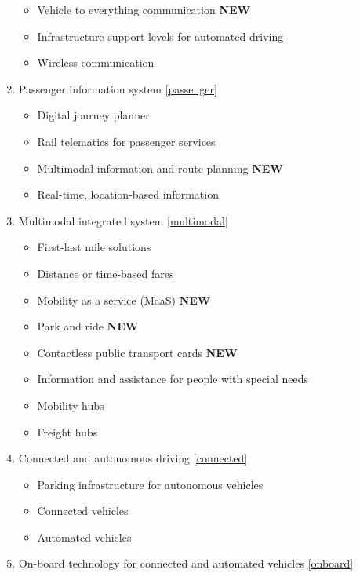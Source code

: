 \documentclass[
]{book}
\providecommand{\tightlist}{%
  \setlength{\itemsep}{0pt}\setlength{\parskip}{0pt}}
\begin{document}
\begin{enumerate}
  \begin{itemize}
  \tightlist
  \item
    Vehicle to everything communication \textbf{NEW}
  \item
    Infrastructure support levels for automated driving
  \item
    Wireless communication
  \end{itemize}
\item
  Passenger information system \ref{passenger}

  \begin{itemize}
  \tightlist
  \item
    Digital journey planner
  \item
    Rail telematics for passenger services
  \item
    Multimodal information and route planning \textbf{NEW}
  \item
    Real-time, location-based information
  \end{itemize}
\item
  Multimodal integrated system \ref{multimodal}

  \begin{itemize}
  \tightlist
  \item
    First-last mile solutions
  \item
    Distance or time-based fares
  \item
    Mobility as a service (MaaS) \textbf{NEW}
  \item
    Park and ride \textbf{NEW}
  \item
    Contactless public transport cards \textbf{NEW}
  \item
    Information and assistance for people with special needs
  \item
    Mobility hubs
  \item
    Freight hubs
  \end{itemize}
\item
  Connected and autonomous driving \ref{connected}

  \begin{itemize}
  \tightlist
  \item
    Parking infrastructure for autonomous vehicles
  \item
    Connected vehicles
  \item
    Automated vehicles
  \end{itemize}
\item
  On-board technology for connected and automated vehicles \ref{onboard}


\end{enumerate}
\end{document}
